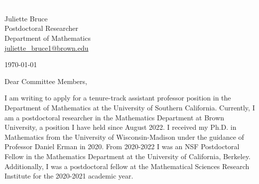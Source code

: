 \documentclass[11pt]{article}
\begin{document}
\section*{}

\noindent
\begin{minipage}{0.99\textwidth}
\begin{minipage}{0.69\textwidth}
\textcolor{white}{.}
\end{minipage}
\begin{minipage}{0.29\textwidth}
{
Juliette Bruce \\
Postdoctoral Researcher \\
Department of Mathematics \\
\href{mailto:juliette\_bruce1@brown.edu}{juliette\_bruce1@brown.edu}
}

\vspace{12pt}
\today
\end{minipage}
\end{minipage}


\vspace{12pt}
\noindent
Dear Committee Members,

I am writing to apply for a tenure-track assistant professor position in the Department of Mathematics at the University of Southern California. Currently, I am a postdoctoral researcher in the Mathematics Department at Brown University, a position I have held since August 2022. I received my Ph.D. in Mathematics from the University of Wisconsin-Madison under the guidance of Professor Daniel Erman in 2020. From 2020-2022 I was an NSF Postdoctoral Fellow in the Mathematics Department at the University of California, Berkeley. Additionally, I was a postdoctoral fellow at the Mathematical Sciences Research Institute for the 2020-2021 academic year.
\end{document}
